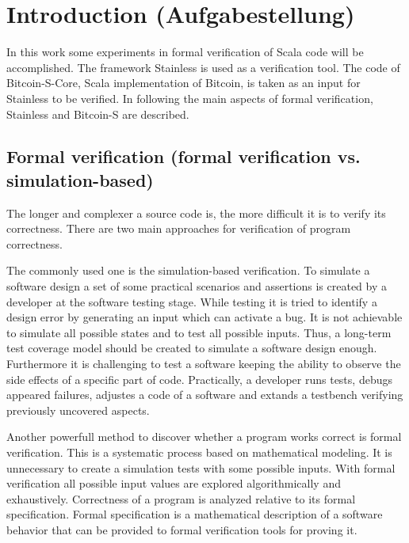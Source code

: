 \chapter{Introduction (Aufgabestellung)}
\label{chap:introduction}

In this work some experiments in formal verification of Scala code will be accomplished. 
The framework Stainless is used as a verification tool. The code of Bitcoin-S-Core, Scala implementation of Bitcoin, is taken as an input for Stainless to be verified. 
In following the main aspects of formal verification, Stainless and Bitcoin-S are described.

\nocite{kopka:band1}
\nocite{raichle:bibtex_programmierung}
\nocite{MiKTeX}
\nocite{KOMA}
\nocite{TeXnicCenter}
\nocite{Marti06}
\nocite{Erbsland08}
\nocite{juergens:einfuehrung}
\nocite{juergens:fortgeschritten}

\section{Formal verification (formal verification vs. simulation-based)}
\label{sec:formal_verification}

The longer and complexer a source code is, the more difficult it is to verify its correctness.
There are two main approaches for verification of program correctness. 

The commonly used one is the simulation-based verification.
To simulate a software design a set of some practical scenarios and assertions is created by a developer at the software testing stage. 
While testing it is tried to identify a design error by generating an input which can activate a bug.
It is not achievable to simulate all possible states and to test all possible inputs. 
Thus, a long-term test coverage model should be created to simulate a software design enough.
Furthermore it is challenging to test a software keeping the ability to observe the side effects of a specific part of code.
Practically, a developer runs tests, debugs appeared failures, adjustes a code of a software and extands a testbench verifying previously uncovered aspects. \cite{sanghavi:formal_verification}

Another powerfull method to discover whether a program works correct is formal verification. 
This is a systematic process based on mathematical modeling. 
It is unnecessary to create a simulation tests with some possible inputs. 
With formal verification all possible input values are explored algorithmically and exhaustively.
Correctness of a program is analyzed relative to its formal specification.
Formal specification is a mathematical description of a software behavior that can be provided to formal verification tools for proving it. \cite{sanghavi:formal_verification}

